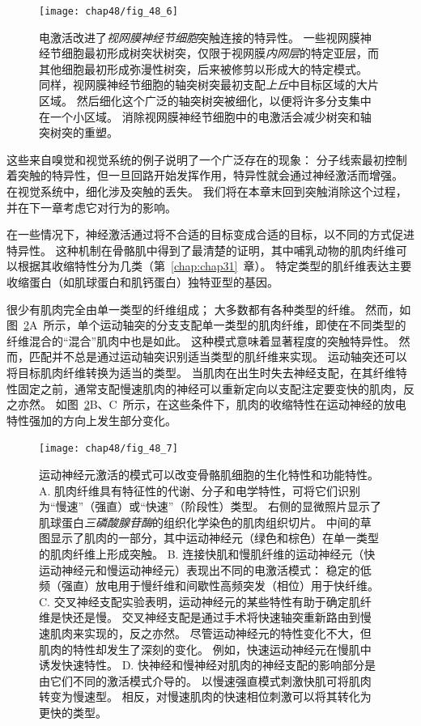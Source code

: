 \begin{figure}[htbp]
	\centering
	\texttt{[image: chap48/fig\_48\_6]}
	\caption{电激活改进了\textit{视网膜神经节细胞}突触连接的特异性。
		一些视网膜神经节细胞最初形成树突状树突，仅限于视网膜\textit{内网层}的特定亚层，而其他细胞最初形成弥漫性树突，后来被修剪以形成大的特定模式。
		同样，视网膜神经节细胞的轴突树突最初支配\textit{上丘}中目标区域的大片区域。
		然后细化这个广泛的轴突树突被细化，以便将许多分支集中在一个小区域。
		消除视网膜神经节细胞中的电激活会减少树突和轴突树突的重塑。}
	\label{fig:48_6}
\end{figure}


这些来自嗅觉和视觉系统的例子说明了一个广泛存在的现象：
分子线索最初控制着突触的特异性，但一旦回路开始发挥作用，特异性就会通过神经激活而增强。
在视觉系统中，细化涉及突触的丢失。
我们将在本章末回到突触消除这个过程，并在下一章考虑它对行为的影响。


在一些情况下，神经激活通过将不合适的目标变成合适的目标，以不同的方式促进特异性。
这种机制在骨骼肌中得到了最清楚的证明，其中哺乳动物的肌肉纤维可以根据其收缩特性分为几类（第~\ref{chap:chap31}~章）。
特定类型的肌纤维表达主要收缩蛋白（如肌球蛋白和肌钙蛋白）独特亚型的基因。


很少有肌肉完全由单一类型的纤维组成；
大多数都有各种类型的纤维。
然而，如图~\ref{fig:48_7}A~所示，单个运动轴突的分支支配单一类型的肌肉纤维，即使在不同类型的纤维混合的“混合”肌肉中也是如此。
这种模式意味着显著程度的突触特异性。
然而，匹配并不总是通过运动轴突识别适当类型的肌纤维来实现。
运动轴突还可以将目标肌肉纤维转换为适当的类型。
当肌肉在出生时失去神经支配，在其纤维特性固定之前，通常支配慢速肌肉的神经可以重新定向以支配注定要变快的肌肉，反之亦然。
如图~\ref{fig:48_7}B、C~所示，在这些条件下，肌肉的收缩特性在运动神经的放电特性强加的方向上发生部分变化。


\begin{figure}[htbp]
	\centering
	\texttt{[image: chap48/fig\_48\_7]}
	\caption{运动神经元激活的模式可以改变骨骼肌细胞的生化特性和功能特性。
		A. 肌肉纤维具有特征性的代谢、分子和电学特性，可将它们识别为“慢速”（强直）或“快速”（阶段性）类型。
		右侧的显微照片显示了肌球蛋白\textit{三磷酸腺苷酶}的组织化学染色的肌肉组织切片。
		中间的草图显示了肌肉的一部分，其中运动神经元（绿色和棕色）在单一类型的肌肉纤维上形成突触。
		B. 连接快肌和慢肌纤维的运动神经元（快运动神经元和慢运动神经元）表现出不同的电激活模式：
		稳定的低频（强直）放电用于慢纤维和间歇性高频突发（相位）用于快纤维。
		C. 交叉神经支配实验表明，运动神经元的某些特性有助于确定肌纤维是快还是慢。
		交叉神经支配是通过手术将快速轴突重新路由到慢速肌肉来实现的，反之亦然。
		尽管运动神经元的特性变化不大，但肌肉的特性却发生了深刻的变化。
		例如，快速运动神经元在慢肌中诱发快速特性\cite{salmons1976significance}。
		D. 快神经和慢神经对肌肉的神经支配的影响部分是由它们不同的激活模式介导的。
		以慢速强直模式刺激快肌可将肌肉转变为慢速型。
		相反，对慢速肌肉的快速相位刺激可以将其转化为更快的类型。}
	\label{fig:48_7}
\end{figure}


